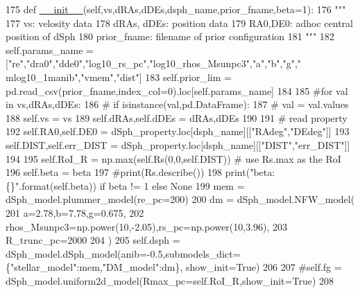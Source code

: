 \begin{DoxyCode}
175     \textcolor{keyword}{def }\hyperlink{classsampler_1_1Sampler_a0ebbb93e5c948bc426658cbdc92bfd12}{\_\_init\_\_}(self,vs,dRAs,dDEs,dsph\_name,prior\_fname,beta=1):
176         \textcolor{stringliteral}{"""}
177 \textcolor{stringliteral}{        vs: velosity data}
178 \textcolor{stringliteral}{        dRAs, dDEs: position data}
179 \textcolor{stringliteral}{        RA0,DE0: adhoc central position of dSph }
180 \textcolor{stringliteral}{        prior\_fname: filename of prior configuration}
181 \textcolor{stringliteral}{        """}
182         self.params\_name = [\textcolor{stringliteral}{"re"},\textcolor{stringliteral}{"dra0"},\textcolor{stringliteral}{"dde0"},\textcolor{stringliteral}{"log10\_rs\_pc"},\textcolor{stringliteral}{"log10\_rhos\_Msunpc3"},\textcolor{stringliteral}{"a"},\textcolor{stringliteral}{"b"},\textcolor{stringliteral}{"g"},\textcolor{stringliteral}{"
      mlog10\_1manib"},\textcolor{stringliteral}{"vmem"},\textcolor{stringliteral}{"dist"}]
183         self.prior\_lim = pd.read\_csv(prior\_fname,index\_col=0).loc[self.params\_name]
184         
185         \textcolor{comment}{#for val in vs,dRAs,dDEs:}
186         \textcolor{comment}{#    if isinstance(val,pd.DataFrame):}
187         \textcolor{comment}{#        val = val.values}
188         self.vs = vs
189         self.dRAs,self.dDEs = dRAs,dDEs
190         
191         \textcolor{comment}{# read property}
192         self.RA0,self.DE0 = dSph\_property.loc[dsph\_name][[\textcolor{stringliteral}{"RAdeg"},\textcolor{stringliteral}{"DEdeg"}]]
193         self.DIST,self.err\_DIST = dSph\_property.loc[dsph\_name][[\textcolor{stringliteral}{"DIST"},\textcolor{stringliteral}{"err\_DIST"}]]
194 
195         self.RoI\_R = np.max(self.Rs(0,0,self.DIST)) \textcolor{comment}{# use Rs.max as the RoI}
196         self.beta = beta
197         \textcolor{comment}{#print(Rs.describe())}
198         print(\textcolor{stringliteral}{"beta: \{\}"}.format(self.beta)) \textcolor{keywordflow}{if} beta != 1 \textcolor{keywordflow}{else} \textcolor{keywordtype}{None}
199         mem = dSph\_model.plummer\_model(re\_pc=200)
200         dm = dSph\_model.NFW\_model(
201             a=2.78,b=7.78,g=0.675,
202             rhos\_Msunpc3=np.power(10,-2.05),rs\_pc=np.power(10,3.96),
203             R\_trunc\_pc=2000
204         )
205         self.dsph = dSph\_model.dSph\_model(anib=-0.5,submodels\_dict=\{\textcolor{stringliteral}{"stellar\_model"}:mem,\textcolor{stringliteral}{"DM\_model"}:dm\},
      show\_init=\textcolor{keyword}{True})
206         
207         \textcolor{comment}{#self.fg = dSph\_model.uniform2d\_model(Rmax\_pc=self.RoI\_R,show\_init=True)}
208 
\end{DoxyCode}


